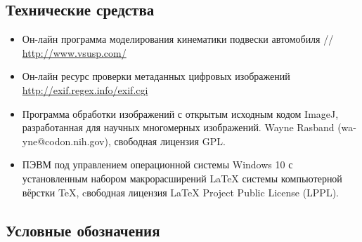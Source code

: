 \subsection{Технические средства}  %
\begin{itemize}
%
\item Он-лайн программа моделирования кинематики подвески автомобиля // \url{http://www.vsusp.com/}
\item Он-лайн ресурс проверки метаданных цифровых изображений \url{http://exif.regex.info/exif.cgi}
\item  Программа обработки изображений с открытым исходным кодом ImageJ, разработанная для научных многомерных изображений.  Wayne Rasband (wa-yne@codon.nih.gov),
свободная лицензия GPL.
\item  ПЭВМ под управлением операционной системы Windows 10 с установленным набором макрорасширений LaTeX системы компьютерной вёрстки TeX, cвободная лицензия LaTeX Project Public License (LPPL). 
%	
\end{itemize}
\subsection{Условные обозначения}

